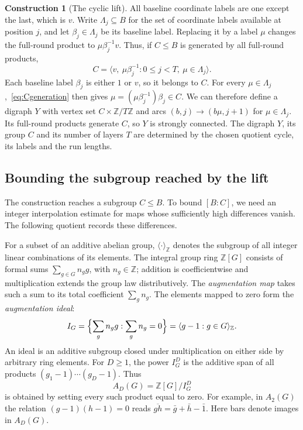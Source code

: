 \documentclass[11pt,a4paper,reqno]{amsart}
\theoremstyle{definition}
\newtheorem{construction}[theorem]{Construction}
\theoremstyle{remark}
\numberwithin{equation}{section}
\newcommand{\Z}{\mathbb Z}
\newcommand{\gen}[1]{\langle #1\rangle}
\newcommand{\spanZ}[1]{\langle #1\rangle_{\Z}}
\begin{document}
\begin{construction}[The cyclic lift]
All baseline coordinate labels are one except the last, which is $v$. Write $\Lambda_j\subseteq B$ for the set of coordinate labels available at position $j$, and let $\beta_j\in\Lambda_j$ be its baseline label. Replacing it by a label $\mu$ changes the full-round product to $\mu\beta_j^{-1}v$. Thus, if $C\le B$ is generated by all full-round products,
\begin{equation}\label{eq:Cgeneration}
 C=\gen{v,\ \mu\beta_j^{-1}:0\le j<T,\ \mu\in\Lambda_j}.
\end{equation}
Each baseline label $\beta_j$ is either $1$ or $v$, so it belongs to $C$. For every $\mu\in\Lambda_j$,~\eqref{eq:Cgeneration} then gives $\mu=(\mu\beta_j^{-1})\beta_j\in C$. We can therefore define a digraph $Y$ with vertex set $C\times\Z/T\Z$ and arcs $(b,j)\to(b\mu,j+1)$ for $\mu\in\Lambda_j$. Its full-round products generate $C$, so $Y$ is strongly connected. The digraph $Y$, its group $C$ and its number of layers $T$ are determined by the chosen quotient cycle, its labels and the run lengths.
\end{construction}

\subsection{Bounding the subgroup reached by the lift}\label{subsec:passi}\label{subsec:determination}
The construction reaches a subgroup $C\le B$. To bound $[B:C]$, we need an integer interpolation estimate for maps whose sufficiently high differences vanish. The following quotient records these differences.

For a subset of an additive abelian group, $\spanZ{\cdot}$ denotes the subgroup of all integer linear combinations of its elements. The integral group ring $\Z[G]$ consists of formal sums $\sum_{g\in G}n_g g$, with $n_g\in\Z$; addition is coefficientwise and multiplication extends the group law distributively. The \emph{augmentation map} takes such a sum to its total coefficient $\sum_g n_g$. The elements mapped to zero form the \emph{augmentation ideal}:
\[
 I_G=\Bigl\{\sum_g n_g g:\sum_g n_g=0\Bigr\}
     =\spanZ{g-1:g\in G}.
\]
An ideal is an additive subgroup closed under multiplication on either side by arbitrary ring elements. For $D\ge1$, the power $I_G^D$ is the additive span of all products $(g_1-1)\cdots(g_D-1)$. Thus
\[
 A_D(G)=\Z[G]/I_G^D
\]
is obtained by setting every such product equal to zero. For example, in $A_2(G)$ the relation $(g-1)(h-1)=0$ reads $\overline{gh}=\bar g+\bar h-\bar1$. Here bars denote images in $A_D(G)$.
\end{document}
